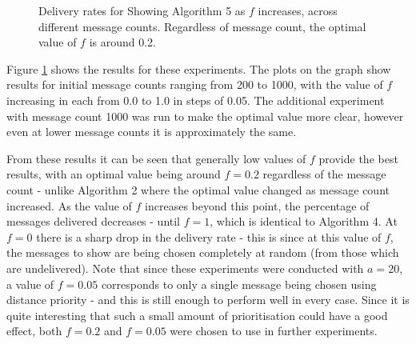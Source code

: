 \documentclass[bsc,frontabs,twoside,singlespacing,parskip,deptreport]{infthesis}     %
\begin{document}
\begin{figure}
\centering
{}
\caption{Delivery rates for Showing Algorithm 5 as $f$ increases, across different message counts. Regardless of message count, the optimal value of $f$ is around 0.2.}
\label{fig:distance_priority_fraction}
\end{figure}

Figure \ref{fig:distance_priority_fraction} shows the results for these experiments. The plots on the graph show results for initial message counts ranging from 200 to 1000, with the value of $f$ increasing in each from 0.0 to 1.0 in steps of 0.05. The additional experiment with message count 1000 was run to make the optimal value more clear, however even at lower message counts it is approximately the same.

From these results it can be seen that generally low values of $f$ provide the best results, with an optimal value being around $f=0.2$ regardless of the message count - unlike Algorithm 2 where the optimal value changed as message count increased. As the value of $f$ increases beyond this point, the percentage of messages delivered decreases - until $f=1$, which is identical to Algorithm 4. At $f=0$ there is a sharp drop in the delivery rate - this is since at this value of $f$, the messages to show are being chosen completely at random (from those which are undelivered). Note that since these experiments were conducted with $a=20$, a value of $f=0.05$ corresponds to only a single message being chosen using distance priority - and this is still enough to perform well in every case. Since it is quite interesting that such a small amount of prioritisation could have a good effect, both $f=0.2$ and $f=0.05$ were chosen to use in further experiments.
\end{document}
